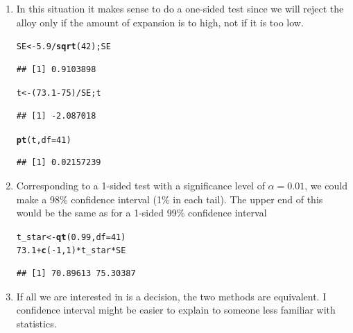 \documentclass[twoside]{book}
\makeatletter
\newcommand{\hlnum}[1]{\textcolor[rgb]{0.686,0.059,0.569}{#1}}%
\newcommand{\hlopt}[1]{\textcolor[rgb]{0,0,0}{#1}}%
\newcommand{\hlstd}[1]{\textcolor[rgb]{0.345,0.345,0.345}{#1}}%
\newcommand{\hlkwb}[1]{\textcolor[rgb]{0.69,0.353,0.396}{#1}}%
\newcommand{\hlkwc}[1]{\textcolor[rgb]{0.333,0.667,0.333}{#1}}%
\newcommand{\hlkwd}[1]{\textcolor[rgb]{0.737,0.353,0.396}{\textbf{#1}}}%
\newenvironment{kframe}{%
 \def\at@end@of@kframe{}%
 \ifinner\ifhmode%
  \def\at@end@of@kframe{\end{minipage}}%
  \begin{minipage}{\columnwidth}%
 \fi\fi%
 \def\FrameCommand##1{\hskip\@totalleftmargin \hskip-\fboxsep
 \colorbox{shadecolor}{##1}\hskip-\fboxsep
     \hskip-\linewidth \hskip-\@totalleftmargin \hskip\columnwidth}%
 \MakeFramed {\advance\hsize-\width
   \@totalleftmargin\z@ \linewidth\hsize
   \@setminipage}}%
 {\par\unskip\endMakeFramed%
 \at@end@of@kframe}
\newenvironment{knitrout}{}{} %
\makeatother
\begin{document}
\begin{solution}
	\begin{enumerate}
		\item
			In this situation it makes sense to do a one-sided test since we will reject
			the alloy only if the amount of expansion is to high, not if it is too low.
\begin{knitrout}
\color{fgcolor}\begin{kframe}
\begin{alltt}
\hlstd{SE} \hlkwb{<-} \hlnum{5.9}\hlopt{/}\hlkwd{sqrt}\hlstd{(}\hlnum{42}\hlstd{); SE}
\end{alltt}
\begin{verbatim}
## [1] 0.9103898
\end{verbatim}
\begin{alltt}
\hlstd{t} \hlkwb{<-} \hlstd{(}\hlnum{73.1} \hlopt{-} \hlnum{75}\hlstd{)} \hlopt{/} \hlstd{SE; t}
\end{alltt}
\begin{verbatim}
## [1] -2.087018
\end{verbatim}
\begin{alltt}
\hlkwd{pt}\hlstd{(t,} \hlkwc{df}\hlstd{=}\hlnum{41}\hlstd{)}
\end{alltt}
\begin{verbatim}
## [1] 0.02157239
\end{verbatim}
\end{kframe}
\end{knitrout}
		\item
			Corresponding to a 1-sided test with a significance level of $\alpha = 0.01$,
			we could make a 98\% confidence interval (1\% in each tail).  The upper end of this
			would be the same as for a 1-sided 99\% confidence interval
\begin{knitrout}
\color{fgcolor}\begin{kframe}
\begin{alltt}
\hlstd{t_star} \hlkwb{<-} \hlkwd{qt}\hlstd{(}\hlnum{0.99}\hlstd{,} \hlkwc{df} \hlstd{=} \hlnum{41}\hlstd{)}
\hlnum{73.1} \hlopt{+} \hlkwd{c}\hlstd{(}\hlopt{-}\hlnum{1}\hlstd{,} \hlnum{1}\hlstd{)} \hlopt{*} \hlstd{t_star} \hlopt{*} \hlstd{SE}
\end{alltt}
\begin{verbatim}
## [1] 70.89613 75.30387
\end{verbatim}
\end{kframe}
\end{knitrout}
		\item
			If all we are interested in is a decision, the two methods are equivalent.
			I confidence interval might be easier to explain to someone less familiar with
			statistics.
	\end{enumerate}

\end{solution}
\end{document}
